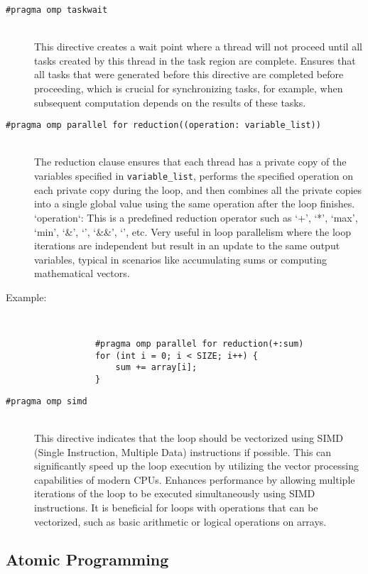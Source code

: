 \begin{description}
    \item[\texttt{\#pragma omp taskwait}] \hfill \\
        This directive creates a wait point where a thread will not proceed until all tasks created by this thread in the task region are complete. Ensures that all tasks that were generated before this directive are completed before proceeding, which is crucial for synchronizing tasks, for example, when subsequent computation depends on the results of these tasks.
    
    \item[\texttt{\#pragma omp parallel for reduction((operation: variable\_list))}] \hfill \\
        The reduction clause ensures that each thread has a private copy of the variables specified in \texttt{variable\_list}, performs the specified operation on each private copy during the loop, and then combines all the private copies into a single global value using the same operation after the loop finishes. `operation`: This is a predefined reduction operator such as `+', `*', `max', `min', `\&', `\textbar', `\&\&', `\textbar\textbar', etc. Very useful in loop parallelism where the loop iterations are independent but result in an update to the same output variables, typical in scenarios like accumulating sums or computing mathematical vectors.
    
    \item[Example:] \hfill \\
        \begin{verbatim}
            #pragma omp parallel for reduction(+:sum)
            for (int i = 0; i < SIZE; i++) {
                sum += array[i];
            }
        \end{verbatim}
    
    \item[\texttt{\#pragma omp simd}] \hfill \\
        This directive indicates that the loop should be vectorized using SIMD (Single Instruction, Multiple Data) instructions if possible. This can significantly speed up the loop execution by utilizing the vector processing capabilities of modern CPUs. Enhances performance by allowing multiple iterations of the loop to be executed simultaneously using SIMD instructions. It is beneficial for loops with operations that can be vectorized, such as basic arithmetic or logical operations on arrays.
\end{description}
\subsection{Atomic Programming} \label{appendix:atomic1}
